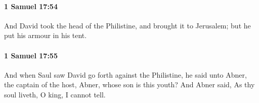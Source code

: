		\paragraph{1 Samuel 17:54} %
			\label{1SAMUEL-17-54}

			And David took the head of the Philistine, and brought it to Jerusalem; but he put his armour in his tent.


		\paragraph{1 Samuel 17:55} %
			\label{1SAMUEL-17-55}

			And when Saul saw David go forth against the Philistine, he said unto Abner, the captain of the host, Abner, whose son is this youth? And Abner said, As thy soul liveth, O king, I cannot tell.



